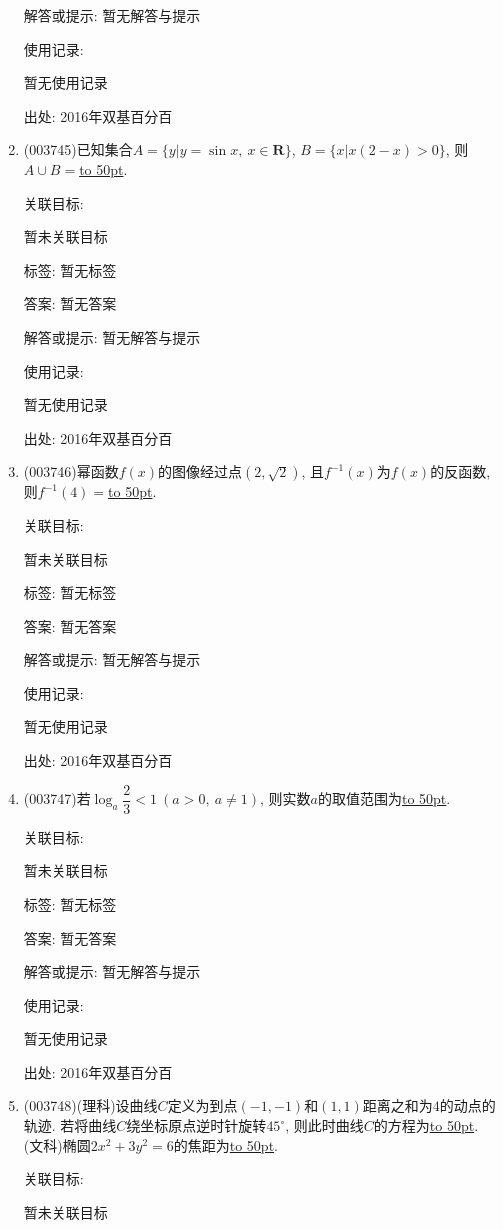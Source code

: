 \documentclass[10pt,a4paper]{article}
\newcommand{\blank}[1]{\underline{\hbox to #1pt{}}}
\begin{document}
\begin{enumerate}[1.]
解答或提示: 暂无解答与提示

使用记录:

暂无使用记录


出处: 2016年双基百分百
\item { (003745)}已知集合$A=\{y|y=\sin x, \ x\in \mathbf{R}\}$, $B=\{x|x(2-x)>0\}$, 则$A\cup B=$\blank{50}.


关联目标:

暂未关联目标



标签: 暂无标签

答案: 暂无答案

解答或提示: 暂无解答与提示

使用记录:

暂无使用记录


出处: 2016年双基百分百
\item { (003746)}幂函数$f(x)$的图像经过点$(2,\sqrt{2})$, 且$f^{-1}(x)$为$f(x)$的反函数, 则$f^{-1}(4)=$\blank{50}.


关联目标:

暂未关联目标



标签: 暂无标签

答案: 暂无答案

解答或提示: 暂无解答与提示

使用记录:

暂无使用记录


出处: 2016年双基百分百
\item { (003747)}若$\log_a \dfrac 23<1 \ (a>0, \ a\ne 1)$, 则实数$a$的取值范围为\blank{50}.


关联目标:

暂未关联目标



标签: 暂无标签

答案: 暂无答案

解答或提示: 暂无解答与提示

使用记录:

暂无使用记录


出处: 2016年双基百分百
\item { (003748)}(理科)设曲线$C$定义为到点$(-1,-1)$和$(1,1)$距离之和为$4$的动点的轨迹. 若将曲线$C$绕坐标原点逆时针旋转$45^\circ$, 则此时曲线$C$的方程为\blank{50}.\\
(文科)椭圆$2x^2+3y^2=6$的焦距为\blank{50}.


关联目标:

暂未关联目标




\end{enumerate}
\end{document}
